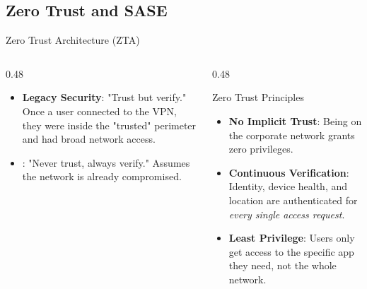 \documentclass[aspectratio=169]{beamer}  %
\begin{document}
\subsection{Zero Trust and SASE}
\begin{frame}[t]{Zero Trust Architecture (ZTA)}
    \begin{columns}[T]
        \begin{column}{0.48\textwidth}
            \begin{itemize}
                \item \textbf{Legacy Security}: "Trust but verify." Once a user connected to the VPN, they were inside the "trusted" perimeter and had broad network access.
                \item {}: "Never trust, always verify." Assumes the network is already compromised.
            \end{itemize}
        \end{column}
        \begin{column}{0.48\textwidth}
            \begin{block}{Zero Trust Principles}
                \footnotesize
                \begin{itemize}
                    \item \textbf{No Implicit Trust}: Being on the corporate network grants zero privileges.
                    \item \textbf{Continuous Verification}: Identity, device health, and location are authenticated for \textit{every single access request}.
                    \item \textbf{Least Privilege}: Users only get access to the specific app they need, not the whole network.
                \end{itemize}
            \end{block}
        \end{column}
    \end{columns}
\end{frame}
\end{document}
